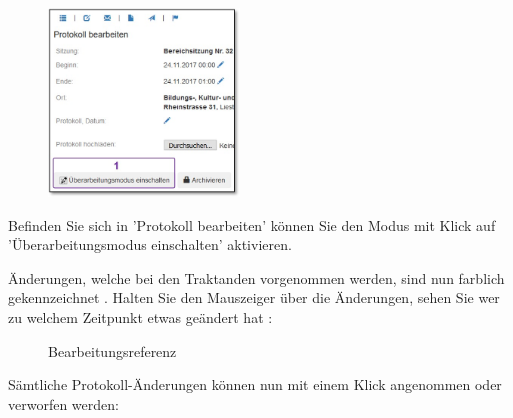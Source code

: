 \begin{figure}
  \vspace{-40pt}
  \begin{center}
    \includegraphics[height=50mm]{../chapters/05_Sitzungswesen/pictures/5-3_GlobalerUeberarbModus.jpg}
  \end{center}
  \vspace{-20pt}
  \vspace{-10pt}
\end{figure}
Befinden Sie sich in 'Protokoll bearbeiten' können Sie den Modus mit Klick auf 'Überarbeitungsmodus einschalten'  aktivieren. 

\vspace{\baselineskip}

Änderungen, welche bei den Traktanden vorgenommen werden, sind nun farblich gekennzeichnet . Halten Sie den Mauszeiger über die Änderungen, sehen Sie wer zu welchem Zeitpunkt etwas geändert hat :

\begin{figure}[H]
\caption{Bearbeitungsreferenz}
\end{figure}

Sämtliche Protokoll-Änderungen können nun mit einem Klick angenommen oder verworfen werden:

\begin{figure}[H]
\end{figure}

